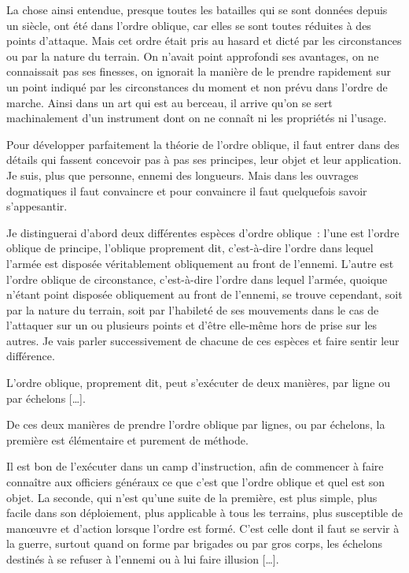 \documentclass[french,twoside]{book} %
\begin{document}
La chose ainsi entendue, presque toutes les batailles qui se sont données depuis un siècle, ont été dans l’ordre oblique, car elles se sont toutes réduites à des points d’attaque. Mais cet ordre était pris au hasard et dicté par les circonstances ou par la nature du terrain. On n’avait point approfondi ses avantages, on ne connaissait pas ses finesses, on ignorait la manière de le prendre rapidement sur un point indiqué par les circonstances du moment et non prévu dans l’ordre de marche. Ainsi dans un art qui est au berceau, il arrive qu’on se sert machinalement d’un instrument dont on ne connaît ni les propriétés ni l’usage.\par
Pour développer parfaitement la théorie de l’ordre oblique, il faut entrer dans des détails qui fassent concevoir pas à pas ses principes, leur objet et leur application. Je suis, plus que personne, ennemi des longueurs. Mais dans les ouvrages dogmatiques il faut convaincre et pour convaincre il faut quelquefois savoir s’appesantir.\par
Je distinguerai d’abord deux différentes espèces d’ordre oblique : l’une est l’ordre oblique de principe, l’oblique proprement dit, c’est-à-dire l’ordre dans lequel l’armée est disposée véritablement obliquement au front de l’ennemi. L’autre est l’ordre oblique de circonstance, c’est-à-dire l’ordre dans lequel l’armée, quoique n’étant point disposée obliquement au front de l’ennemi, se trouve cependant, soit par la nature du terrain, soit par l’habileté de ses mouvements dans le cas de l’attaquer sur un ou plusieurs points et d’être elle-même hors de prise sur les autres. Je vais parler successivement de chacune de ces espèces et faire sentir leur différence.\par
L’ordre oblique, proprement dit, peut s’exécuter de deux manières, par ligne ou par échelons […].\par
De ces deux manières de prendre l’ordre oblique par lignes, ou par échelons, la première est élémentaire et purement de méthode.\par
Il est bon de l’exécuter dans un camp d’instruction, afin de commencer à faire connaître aux officiers généraux ce que c’est que l’ordre oblique et quel est son objet. La seconde, qui n’est qu’une suite de la première, est plus simple, plus facile dans son déploiement, plus applicable à tous les terrains, plus susceptible de manœuvre et d’action lorsque l’ordre est formé. C’est celle dont il faut se servir à la guerre, surtout quand on forme par brigades ou par gros corps, les échelons destinés à se refuser à l’ennemi ou à lui faire illusion […].\par
\end{document}
